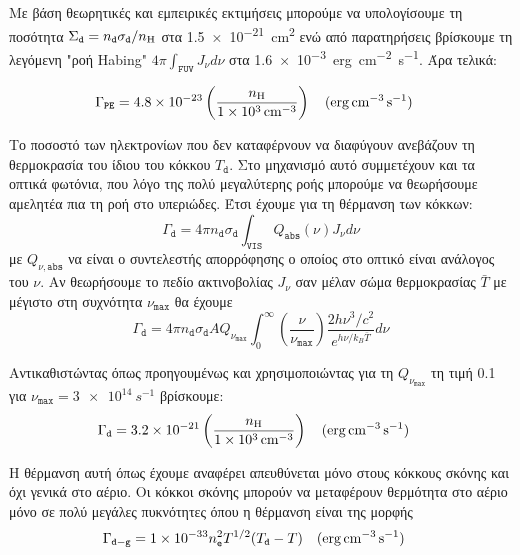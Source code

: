 Με βάση θεωρητικές και εμπειρικές εκτιμήσεις μπορούμε να υπολογίσουμε τη ποσότητα $\Sigma _\mathtt{d} = n_\mathtt{d} \sigma _\mathtt{d}/n_{\ce{H}}$ στα \SI{1.5e-21}{cm^2} ενώ από παρατηρήσεις βρίσκουμε τη λεγόμενη "ροή Habing" $4\pi \int _\mathtt{FUV} J_\nu d\nu$ στα \SI{1.6e-3}{erg.cm^{-2}s^{-1}}. Άρα τελικά:
	
\begin{equation}
\Gamma _\mathtt{PE} = \num{4.8e-23} \left( \frac{n_{\ce{H}}}{\SI{1e3}{cm^{-3}}} \right) \qq{(\si{erg.cm^{-3}.s^{-1}})} 
\end{equation}

Το ποσοστό των ηλεκτρονίων που δεν καταφέρνουν να διαφύγουν ανεβάζουν τη θερμοκρασία του ίδιου του κόκκου $T_\mathtt{d}$. Στο μηχανισμό αυτό συμμετέχουν και τα οπτικά φωτόνια, που λόγο της πολύ μεγαλύτερης ροής μπορούμε να θεωρήσουμε αμελητέα πια τη ροή στο υπεριώδες. Έτσι έχουμε για τη θέρμανση των κόκκων:
\begin{equation}
\Gamma _\mathtt{d}=4\pi n_\mathtt{d} \sigma _\mathtt{d} \int _\mathtt{VIS} Q_\mathtt{abs}(\nu) J_\nu d\nu
\end{equation}  
 με $Q_{\nu,\mathtt{abs}}$ να είναι ο συντελεστής απορρόφησης ο οποίος στο οπτικό είναι ανάλογος του $\nu$. Αν θεωρήσουμε το πεδίο ακτινοβολίας $J_\nu$ σαν μέλαν σώμα θερμοκρασίας $\bar{T}$ με μέγιστο στη συχνότητα $\nu _\mathtt{max}$ θα έχουμε
  \begin{equation}
 \Gamma _\mathtt{d}=4\pi n_\mathtt{d} \sigma _\mathtt{d} A Q_{\nu _\mathtt{max}} 
					 \int _0 ^\infty \left( \frac{\nu}{\nu _\mathtt{max}}\right) 
					 \frac{2h\nu ^3/c^2}{e^{h\nu/k_B \bar{T}}} d\nu
 \end{equation}
 
 Αντικαθιστώντας όπως προηγουμένως και χρησιμοποιώντας για τη $Q_{\nu _\mathtt{max}}$ τη τιμή \num{0.1} για $\nu _\mathtt{max} =\SI{3e14}{s^{-1}}$ βρίσκουμε:
 \begin{equation}
 \Gamma _\mathtt{d} = \num{3.2e-21} \left( \frac{n_{\ce{H}}}{\SI{1e3}{cm^{-3}}} \right) \qq{(\si{erg.cm^{-3}.s^{-1}})} 
 \end{equation} 
 
 Η θέρμανση αυτή όπως έχουμε αναφέρει απευθύνεται μόνο στους κόκκους σκόνης και όχι γενικά στο αέριο. Οι κόκκοι σκόνης μπορούν να μεταφέρουν θερμότητα στο αέριο μόνο σε πολύ μεγάλες πυκνότητες όπου η θέρμανση είναι της μορφής
  \begin{equation}
 \Gamma _\mathtt{d-g} = \num{1e-33} n_\mathtt{e}^2 T^{1/2}(T_\mathtt{d}-T) \qq{(\si{erg.cm^{-3}.s^{-1}})} 
 \end{equation} 
 
